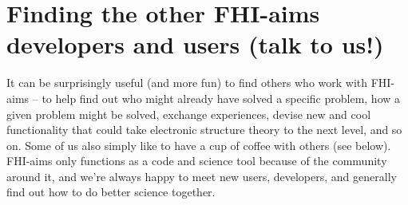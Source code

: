 \section{Finding the other FHI-aims developers and users (talk to us!)}
\label{Sec:community}

It can be surprisingly useful (and more fun) to find others who work with
FHI-aims -- to help find out who might already have solved a specific
problem, how a given problem might be solved, exchange experiences,
devise new and cool functionality that could take electronic structure
theory to the next level, and so on. Some of us also simply like to have
a cup of coffee with others (see below). FHI-aims only functions as a code and
science tool because of the community around it, and we're always
happy to meet new users, developers, and generally find out how to do
better science together.

